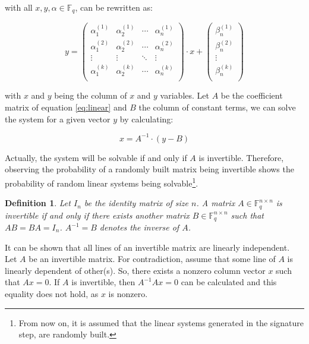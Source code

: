 \documentclass{ufsctex/ufsctex}
\newtheorem{definition}{Definition}
\begin{document}
with all $x, y, \alpha \in \mathbb{F}_q$, can be rewritten as:

\begin{equation}\label{eq:linear}
y =
\begin{pmatrix}
\alpha^{(1)}_1 & \alpha^{(1)}_2 & \cdots & \alpha^{(1)}_n \\
\alpha^{(2)}_1 & \alpha^{(2)}_2 & \cdots & \alpha^{(2)}_n \\
\vdots & \vdots & \ddots & \vdots \\
\alpha^{(k)}_1 & \alpha^{(k)}_2 & \cdots & \alpha^{(k)}_n \\
\end{pmatrix}
\cdot x +
\begin{pmatrix}
\beta^{(1)}_n \\
\beta^{(2)}_n \\
\vdots \\
\beta^{(k)}_n \\
\end{pmatrix}
\end{equation}

with $x$ and $y$ being the column of $x$ and $y$ variables. Let $A$ be the
coefficient matrix of equation \ref{eq:linear} and $B$ the column of constant
terms, we can solve the system for a given vector $y$ by calculating:

\begin{equation}
x = A^{-1} \cdot (y - B)
\end{equation}

Actually, the system will be solvable if and only if $A$ is invertible.
Therefore, observing the probability of a randomly built matrix being
invertible shows the probability of random linear systems being
solvable\footnote{From now on, it is assumed that the linear systems generated
in the signature step, are randomly built.}.

\begin{definition}
Let $I_n$ be the identity matrix of size $n$. A matrix $A \in \mathbb{F}^{n
\times n}_q$ is invertible if and only if there exists another matrix $B \in
\mathbb{F}^{n \times n}_q$ such that $AB = BA = I_n$. $A^{-1} = B$ denotes the
inverse of $A$.
\end{definition}

It can be shown that all lines of an invertible matrix are linearly
independent. Let $A$ be an invertible matrix. For contradiction, assume that
some line of $A$ is linearly dependent of other(s). So, there exists a nonzero
column vector $x$ such that $Ax = 0$. If $A$ is invertible, then $A^{-1}Ax = 0$
can be calculated and this equality does not hold, as $x$ is nonzero.
\end{document}
